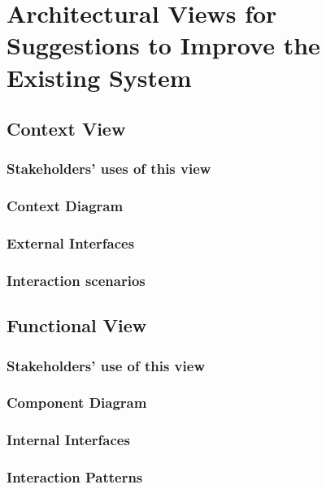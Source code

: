 \chapter{Architectural Views for Suggestions to Improve the Existing System}

\section{Context View}

\subsection{Stakeholders' uses of this view}

\subsection{Context Diagram}

\subsection{External Interfaces}

\subsection{Interaction scenarios}

\section{Functional View}

\subsection{Stakeholders' use of this view}

\subsection{Component Diagram}

\subsection{Internal Interfaces}

\subsection{Interaction Patterns}

